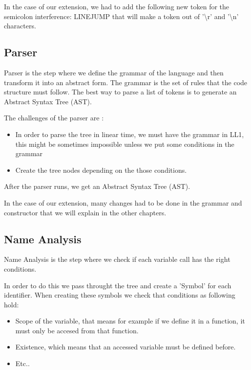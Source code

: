 \textnormal{In the case of our extension, we had to add the following new token
  for the semicolon interference: LINEJUMP that will make a token out of
  '\textbackslash r' and '\textbackslash n' characters.}

\subsection{Parser}
\textnormal{Parser is the step where we define the grammar of the language and
  then transform it into an abstract form. The grammar is the set of rules that
  the code structure must follow. The best way to parse a list of tokens is to
  generate an Abstract Syntax Tree (AST).}

\textnormal{The challenges of the parser are :}
\begin{itemize}
\item In order to parse the tree in linear time, we must have the grammar in
  LL1, this might be sometimes impossible unless we put some conditions in the
  grammar
\item Create the tree nodes depending on the those conditions.
\end{itemize}

\textnormal{After the parser runs, we get an Abstract Syntax Tree (AST).\\}

\textnormal{In the case of our extension, many changes had to be done in the
  grammar and constructor that we will explain in the other chapters.}

\subsection{Name Analysis}
\textnormal{Name Analysis is the step where we check if each variable call has
  the right conditions.}

\textnormal{In order to do this we pass throught the tree and create a 'Symbol'
  for each identifier. When creating these symbols we check that conditions as
  following hold:}

\begin{itemize}
\item Scope of the variable, that means for example if we define it in a
  function, it must only be accesed from that function. 
\item Existence, which means that an accessed variable must be defined before.
\item Etc..
\end{itemize}

